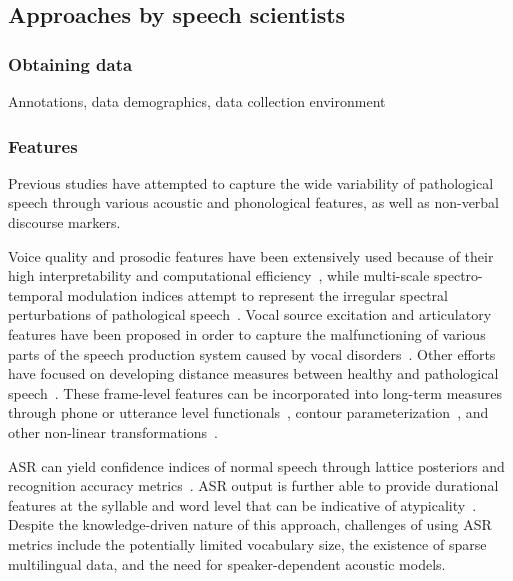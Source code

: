 \documentclass{article}
\begin{document}
\subsection{Approaches by speech scientists}

\subsubsection{Obtaining data}
Annotations, data demographics, data collection environment

\subsubsection{Features}
Previous studies have attempted to capture the wide variability of pathological speech through various acoustic and phonological features, as well as non-verbal discourse markers.

Voice quality and prosodic features have been extensively used because of their high interpretability and computational efficiency~\cite{van2010computational,tsanas2012novel,bone2014psychologist}, while multi-scale spectro-temporal modulation indices attempt to represent the irregular spectral perturbations of pathological speech~\cite{liss2010discriminating,falk2012characterization,williamson2015automatic}. Vocal source excitation and articulatory features have been proposed in order to capture the malfunctioning of various parts of the speech production system caused by vocal disorders~\cite{falk2012characterization,hahm2015parkinson}. Other efforts have focused on developing distance measures between healthy and pathological speech~\cite{gu2005disordered}. These frame-level features can be incorporated into long-term measures through phone or utterance level functionals~\cite{kim2015automatic}, contour parameterization~\cite{kim2015automatic2}, and other non-linear transformations~\cite{kim2015automatic,an2015automatic,middag2011combining}.

ASR can yield confidence indices of normal speech through lattice posteriors and recognition accuracy metrics~\cite{kim2015automatic,zlotnik2015random,maier2009peaks,sharma2009universal,middag2009automated}. ASR output is further able to provide durational features at the syllable and word level that can be indicative of atypicality~\cite{an2015automatic,duez2006consonant}. Despite the knowledge-driven nature of this approach, challenges of using ASR metrics include the potentially limited vocabulary size, the existence of sparse multilingual data, and the need for speaker-dependent acoustic models.
\end{document}
